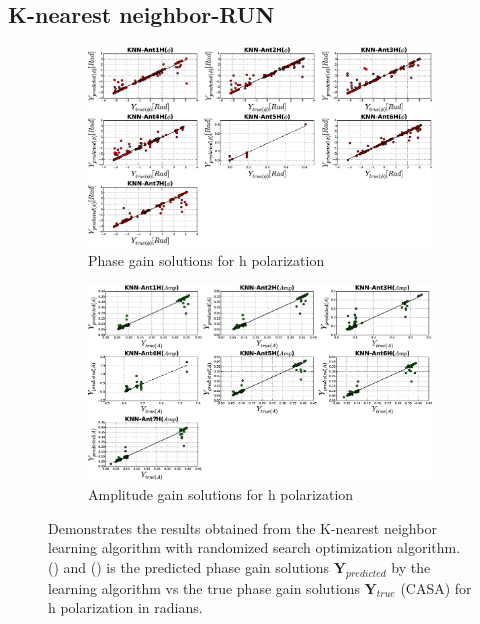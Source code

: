 \subsection{K-nearest neighbor-RUN}
\begin{figure}[H]
   \centering
    \begin{subfigure}[t]{0.52\textheight}
        
        \includegraphics[width=\textwidth]{images/KNNHphase.eps} 
        \caption{Phase gain solutions for h polarization} \label{A4}
    \end{subfigure}
    
      \begin{subfigure}[t]{0.52\textheight}
       
        \includegraphics[width=\textwidth]{images/KNNHamp.eps} 
        \caption{Amplitude gain solutions for h polarization} \label{B4}
    \end{subfigure}
    \caption{Demonstrates the results obtained from the K-nearest neighbor learning algorithm with randomized search optimization algorithm. () and () is the predicted phase gain solutions $\textbf{Y}_{predicted}$ by the learning algorithm vs the true phase gain solutions $\textbf{Y}_{true}$ (CASA) for h polarization in radians. }
    \end{figure}
    
